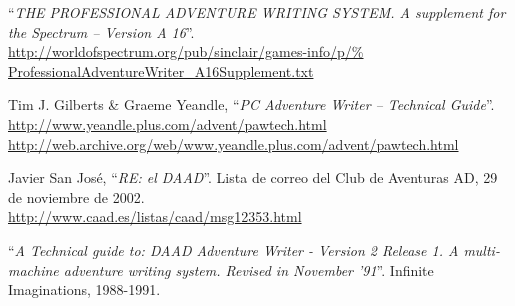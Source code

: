 \documentclass[11pt, a5paper]{article}
\begin{document}
\begin{thebibliography}{99}
  ``\emph{THE PROFESSIONAL ADVENTURE WRITING SYSTEM. A supplement for the
  Spectrum -- Version A 16}''.\\
  \url{http://worldofspectrum.org/pub/sinclair/games-info/p/%
       ProfessionalAdventureWriter_A16Supplement.txt}

  Tim J. Gilberts \& Graeme Yeandle,
  ``\emph{PC Adventure Writer -- Technical Guide}''.\\
  \url{http://www.yeandle.plus.com/advent/pawtech.html}\\
  \url{http://web.archive.org/web/www.yeandle.plus.com/advent/pawtech.html}

  Javier San José,
  ``\emph{RE: el DAAD}''.
  Lista de correo del Club de Aventuras AD,
  29 de noviembre de 2002.\\
  \url{http://www.caad.es/listas/caad/msg12353.html}

  ``\emph{A Technical guide to: DAAD Adventure Writer - Version 2 Release 1. A multi-machine adventure writing system. Revised in November '91}''.
  Infinite Imaginations,
  1988-1991.

\end{thebibliography}
\end{document}
